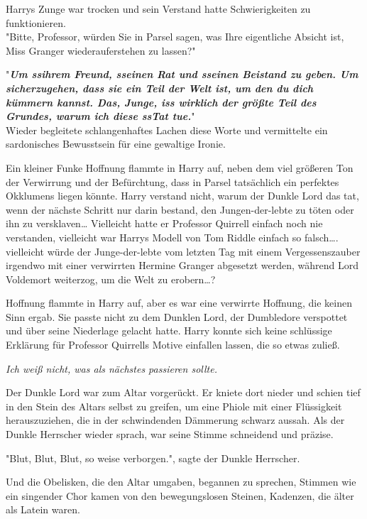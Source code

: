 {Harrys Zunge war trocken und sein Verstand hatte Schwierigkeiten zu funktionieren.\\ "Bitte, Professor, würden Sie in Parsel sagen, was Ihre eigentliche Absicht ist, Miss Granger wiederauferstehen zu lassen?"

"\textbf{\emph{Um ssihrem Freund, sseinen Rat und sseinen Beistand zu geben. Um sicherzugehen, dass sie ein Teil der Welt ist, um den du dich kümmern kannst. Das, Junge, iss wirklich der größte Teil des Grundes, warum ich diese ssTat tue.}}"\\ Wieder begleitete schlangenhaftes Lachen diese Worte und vermittelte ein sardonisches Bewusstsein für eine gewaltige Ironie.

Ein kleiner Funke Hoffnung flammte in Harry auf, neben dem viel größeren Ton der Verwirrung und der Befürchtung, dass in Parsel tatsächlich ein perfektes Okklumens liegen könnte. Harry verstand nicht, warum der Dunkle Lord das tat, wenn der nächste Schritt nur darin bestand, den Jungen-der-lebte zu töten oder ihn zu versklaven… Vielleicht hatte er Professor Quirrell einfach noch nie verstanden, vielleicht war Harrys Modell von Tom Riddle einfach so falsch…. vielleicht würde der Junge-der-lebte vom letzten Tag mit einem Vergessenszauber irgendwo mit einer verwirrten Hermine Granger abgesetzt werden, während Lord Voldemort weiterzog, um die Welt zu erobern…?

Hoffnung flammte in Harry auf, aber es war eine verwirrte Hoffnung, die keinen Sinn ergab. Sie passte nicht zu dem Dunklen Lord, der Dumbledore verspottet und über seine Niederlage gelacht hatte. Harry konnte sich keine schlüssige Erklärung für Professor Quirrells Motive einfallen lassen, die so etwas zuließ.

\emph{Ich weiß nicht, was als nächstes passieren sollte.}

Der Dunkle Lord war zum Altar vorgerückt. Er kniete dort nieder und schien tief in den Stein des Altars selbst zu greifen, um eine Phiole mit einer Flüssigkeit herauszuziehen, die in der schwindenden Dämmerung schwarz aussah. Als der Dunkle Herrscher wieder sprach, war seine Stimme schneidend und präzise.

"Blut, Blut, Blut, so weise verborgen.", sagte der Dunkle Herrscher.

Und die Obelisken, die den Altar umgaben, begannen zu sprechen, Stimmen wie ein singender Chor kamen von den bewegungslosen Steinen, Kadenzen, die älter als Latein waren.\\

}
